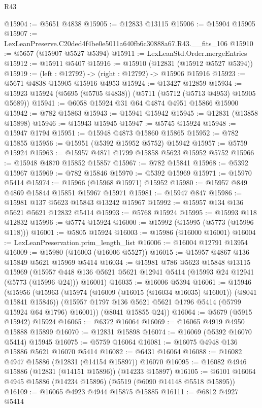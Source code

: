 \begin{lexlean}{R43}
\begin{coremodule}
@15904 := @5651 @4838
@15905 := @12833 @13115
@15906 := @15904 @15905
@15907 := LexLeanPreserve.C20ded4f4be0e5011a640fb6c30888a67.R43.__fits_106
@15910 := @5657 (@15907 @5527 @5394)
@15911 := LexLeanStd.Order.mergeEntries
@15912 := @15911 @5407
@15916 := @15910 (@12831 (@15912 @5527 @5394))
@15919 := (left : @12792) -> (right : @12792) -> @15906 @15916
@15923 := @5671 @4838 @15905 @15916 @4953
@15924 := @13427 @12859
@15934 := @15923 @15924 (@5695 (@5705 @4838)) (@5711 (@5712 (@5713 @4953) @15905 @5689))
@15941 := @6058 @15924 @31 @64 @4874 @4951 @15866 @15900
@15942 := @782 @15863
@15943 := @15941 @15942
@15945 := @12831 (@13858 @15898)
@15946 := @15943 @15945
@15947 := @5745 @15924
@15948 := @15947 @1794
@15951 := @15948 @4873 @15860 @15865
@15952 := @782 @15855
@15956 := @15951 (@5392 @15952 @5752) @15942
@15957 := @5759 @15924
@15963 := @15957 @4871 @1799 @15858 @5623 @15952 @5752
@15966 := @15948 @4870 @15852 @15857
@15967 := @782 @15841
@15968 := @5392 @15967
@15969 := @782 @15846
@15970 := @5392 @15969
@15971 := @15970 @5414
@15974 := @15966 (@15968 @15971) @15952
@15980 := @15957 @849 @4869 @15844 @15851 @15967 @15971
@15981 := @15947 @847
@15986 := @15981 @137 @5623 @15843 @13242 @15967
@15992 := @15957 @134 @136 @5621 @5621 @12832 @5414
@15993 := @5768 @15924
@15995 := @15993 @118 @12832
@15996 := @5774 @15924
@16000 := @15992 (@15995 (@5773 (@15996 @118)))
@16001 := @5805 @15924
@16003 := @15986 (@16000 @16001)
@16004 := LexLeanPreservation.prim_length_list
@16006 := @16004 @12791 @13954
@16009 := @15980 (@16003 (@16006 @5527))
@16015 := @15957 @4867 @136 @15849 @5621 @15969 @5414
@16034 := @15981
    @786
    @5623
    @15848
    @13115
    @15969
    (@15957 @448 @136 @5621 @5621 @12941 @5414 (@15993 @24 @12941 (@5773 (@15996 @24))) @16001)
@16035 := @16006 @5394
@16061 := @15946
    (@15956
      (@15963
        (@15974 (@16009 (@16015 (@16034 @16035) @16001)) (@8041 @15841 @15846))
        (@15957 @1797 @136 @5621 @5621 @1796 @5414 (@5799 @15924 @64 @1796) @16001))
      (@8041 @15855 @24))
@16064 := @5679 (@5915 @15942) @15924
@16065 := @6372 @16064
@16069 := @16065 @4919 @4950 @15888 @15899
@16070 := @12831 @15898
@16074 := @16069 (@5392 @16070 @5414) @15945
@16075 := @5759 @16064
@16081 := @16075 @4948 @136 @15886 @5621 @16070 @5414
@16082 := @6431 @16064
@16088 := @16082 @4947 @15886 (@12831 (@14154 @15897)) @16070
@16095 := @16082 @4946 @15886 (@12831 (@14151 @15896)) (@14233 @15897)
@16105 := @6101 @16064 @4945 @15886 (@14234 @15896) (@5519 (@6090 @14148 @5518 @15895))
@16109 := @16065 @4923 @4944 @15875 @15885
@16111 := @6812 @4927 @5414

\end{coremodule}
\end{lexlean}

